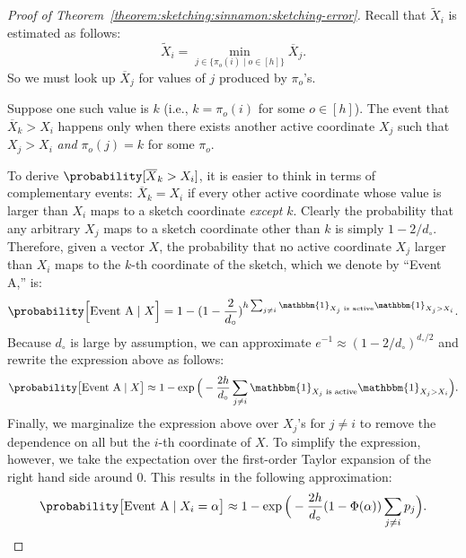 \begin{proof}[Proof of Theorem~\ref{theorem:sketching:sinnamon:sketching-error}]
    Recall that $\tilde{X}_i$ is estimated as follows:
    \begin{equation*}
        \tilde{X}_i = \min_{j \in \{ \pi_o(i) \;|\; o \in [h] \}} \overline{X}_j.
    \end{equation*}
    So we must look up $\overline{X}_j$ for values of $j$ produced by $\pi_o$'s.

    Suppose one such value is $k$ (i.e., $k = \pi_o(i)$ for some $o \in [h]$).
    The event that $\overline{X}_k > X_i$ happens only when there exists another
    active coordinate $X_j$ such that $X_j > X_i$ \emph{and} $\pi_o(j)=k$ for some $\pi_o$.
    
    To derive $\probability[\overline{X}_k > X_i]$, it is easier to think in terms
    of complementary events: $\overline{X}_k = X_i$ if every other active coordinate
    whose value is larger than $X_i$ maps to a sketch coordinate \emph{except} $k$.
    Clearly the probability that any arbitrary $X_j$ maps to a sketch coordinate other
    than $k$ is simply $1 - 2/d_\circ$. Therefore, given a vector $X$, the probability
    that no active coordinate $X_j$ larger than $X_i$ maps to the $k$-th coordinate of the sketch,
    which we denote by ``Event A,'' is:
    \begin{align*}
        \probability\Big[\text{Event A} \;|\; X \Big]
        = 1 - (1 - \frac{2}{d_\circ})^{h\sum_{j \neq i} \mathbbm{1}_{X_j \text{ is active}} \mathbbm{1}_{X_j > X_i}}.
    \end{align*}
    Because $d_\circ$ is large by assumption, we can approximate $e^{-1} \approx (1 - 2/d_\circ)^{d_\circ/2}$ and rewrite the expression above as follows:
    \begin{equation*}
        \probability\big[\text{Event A}  \;|\; X \big] \approx 1 - \exp\Big(-\frac{2h}{d_\circ}\sum_{j \neq i} \mathbbm{1}_{X_j \text{ is active}} \mathbbm{1}_{X_j > X_i} \Big).
    \end{equation*}
    Finally, we marginalize the expression above over $X_j$'s for $j \neq i$ to remove
    the dependence on all but the $i$-th coordinate of $X$.
    To simplify the expression, however, we take the expectation over the first-order
    Taylor expansion of the right hand side around $0$. This results in the following approximation:
    \begin{equation*}
        \probability\big[\text{Event A}  \;|\; X_i = \alpha \big] \approx 1 - \exp\Big(-\frac{2h}{d_\circ} (1 - \Phi(\alpha)) \sum_{j \neq i} p_j\Big).
    \end{equation*}
    

\end{proof}
